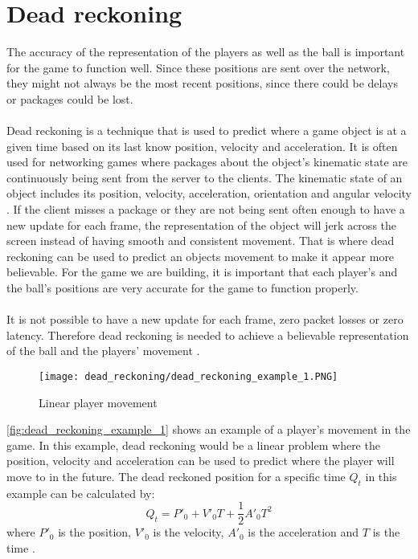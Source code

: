 \section{Dead reckoning}
The accuracy of the representation of the players as well as the ball is important for the game to function well.
Since these positions are sent over the network, they might not always be the most recent positions, since there could be delays or packages could be lost.
\\\\
Dead reckoning is a technique that is used to predict where a game object is at a given time based on its last know position, velocity and acceleration.
It is often used for networking games where packages about the object's kinematic state are continuously being sent from the server to the clients.
The kinematic state of an object includes its position, velocity, acceleration, orientation and angular velocity \autocite{DeadReckoning}.
If the client misses a package or they are not being sent often enough to have a new update for each frame, the representation of the object will jerk across the screen instead of having smooth and consistent movement.
That is where dead reckoning can be used to predict an objects movement to make it appear more believable.
For the game we are building, it is important that each player's and the ball's positions are very accurate for the game to function properly.
\\\\
It is not possible to have a new update for each frame, zero packet losses or zero latency. 
Therefore dead reckoning is needed to achieve a believable representation of the ball and the players' movement \autocite{DeadReckoning}.
\begin{figure}[H]
    \centering
    \texttt{[image: dead\_reckoning/dead\_reckoning\_example\_1.PNG]}
    \caption{Linear player movement}
    \label{fig:dead_reckoning_example_1}
\end{figure}
\noindent
\autoref{fig:dead_reckoning_example_1} shows an example of a player's movement in the game.
In this example, dead reckoning would be a linear problem where the position, velocity and acceleration can be used to predict where the player will move to in the future. 
The dead reckoned position for a specific time $Q_t$ in this example can be calculated by:
\begin{displaymath}
    Q_t = P'_0 + V'_0T + \frac{1}{2}A'_0T^2
\end{displaymath}
where $ P'_0 $ is the position, $ V'_0 $ is the velocity, $ A'_0 $ is the acceleration and $T$ is the time \autocite{DeadReckoning}.
